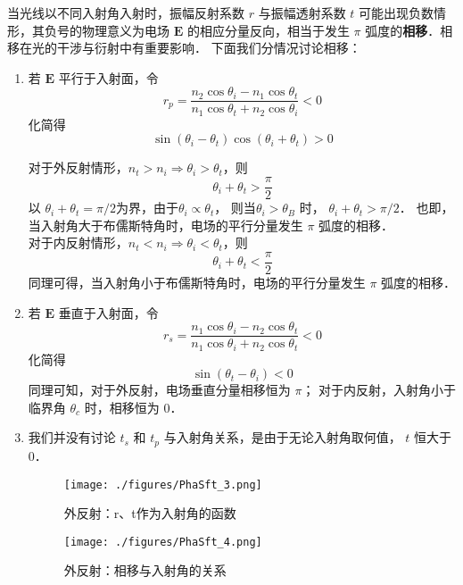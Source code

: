 
\begin{issues}
\issueMissDepend
\end{issues}


当光线以不同入射角入射时，振幅反射系数 $r$ 与振幅透射系数 $t$  可能出现负数情形，其负号的物理意义为电场 $\boldsymbol{E}$ 的相应分量反向，相当于发生 $\pi$ 弧度的\textbf{相移}．相移在光的干涉与衍射中有重要影响．
下面我们分情况讨论相移：
\begin{enumerate}
\item 若 $\boldsymbol{E}$ 平行于入射面，令
$$ r_p =  \dfrac{n_2\cos{\theta_i} - n_1\cos\theta_t}{n_1\cos\theta_t + n_2\cos\theta_i} < 0 $$
化简得
$$ \sin(\theta_i - \theta_t)\cos(\theta_i + \theta_t) > 0$$

对于外反射情形，$n_t > n_i \Rightarrow \theta_i > \theta_t$，则
$$\theta_i + \theta_t > \frac{\pi}{2}$$
以 $\theta_i + \theta_t = \pi/2$为界，由于$\theta_i \propto \theta_t$， 则当$\theta_i > \theta_B$ 时， $\theta_i + \theta_t > \pi/2$． 也即，当入射角大于布儒斯特角时，电场的平行分量发生 $\pi$ 弧度的相移．\\

对于内反射情形，$ n_t < n_i \Rightarrow \theta_i < \theta_t$，则
$$\theta_i + \theta_t < \frac{\pi}{2}$$
同理可得，当入射角小于布儒斯特角时，电场的平行分量发生 $\pi$ 弧度的相移．

\item 若 $\boldsymbol{E}$ 垂直于入射面，令
$$r_s  = \frac{n_1\cos{\theta_i} - n_2\cos\theta_t}{n_1\cos\theta_i + n_2\cos\theta_t} < 0$$
化简得
$$\sin(\theta_t - \theta_i) < 0$$
同理可知，对于外反射，电场垂直分量相移恒为 $\pi$； 对于内反射，入射角小于临界角 $\theta_c$ 时，相移恒为 0．\\

\item 我们并没有讨论 $t_s$ 和 $t_p$ 与入射角关系，是由于无论入射角取何值， $ t$ 恒大于0．

\begin{figure}[ht]
\centering
\texttt{[image: ./figures/PhaSft\_3.png]}
\caption{外反射：r、t作为入射角的函数} \label{PhaSft_fig3}
\end{figure}

\begin{figure}[ht]
\centering
\texttt{[image: ./figures/PhaSft\_4.png]}
\caption{外反射：相移与入射角的关系} \label{PhaSft_fig4}
\end{figure}
\end{enumerate}

